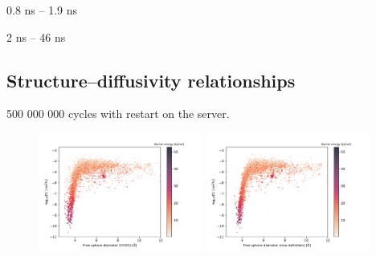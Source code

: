 \documentclass[main]{subfiles}
\begin{document}

0.8 ns -- 1.9 ns

2 ns -- 46 ns








\subsection{Structure--diffusivity relationships}

500 000 000 cycles with restart on the server.


\begin{figure}[ht]
  \centering
    \includegraphics[width=0.48\textwidth]{figures/5-diffusion/difflog_Df-ccdc_barrier.pdf}
    \includegraphics[width=0.48\textwidth]{figures/5-diffusion/difflog_Df-uff298K_barrier.pdf}
    \caption{}\label{fgr:}
\end{figure}
\end{document}
